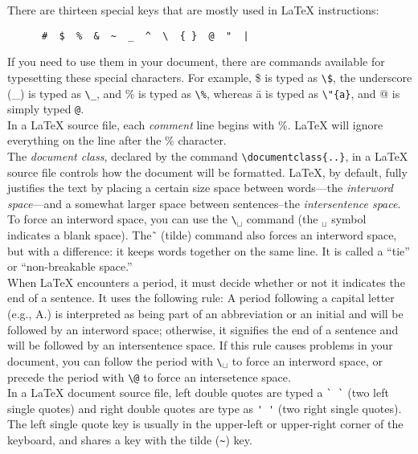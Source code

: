 \documentclass[12pt]{article}
\begin{document}
There are thirteen special keys that are mostly used in \LaTeX \; instructions:
\begin{center}
   \begin{verbatim}
      #  $  %  &  ~  _  ^  \  { }  @  "  |
   \end{verbatim}
\end{center}
If you need to use them in your document, there  are commands available for typesetting these special characters. For example, \$ is typed as \verb+\$+, the underscore (\_) is typed as \verb+\_+, and \% is typed as \verb+\%+, whereas \"{a} is typed as \verb+\"{a}+, and @ is simply typed \verb+@+.\\

In a \LaTeX \; source file, each \emph{comment} line begins with \%. \LaTeX \;  will ignore everything on the line after the \% character. \\

The \emph{document class}, declared by the command \verb+\documentclass{..}+, in a \LaTeX \; source file controls how the document will be formatted. \LaTeX, by default, fully justifies the text by placing a certain size space between words---the \emph{interword space}---and a somewhat larger space between sentences--the \emph{intersentence space}.  To force an interword space, you can use the \verb+\+$_{\sqcup}$ command (the $_{\sqcup}$ symbol indicates a blank space). The \~ \, (tilde) command also forces an interword space, but with a difference: it keeps words together on the same line.  It is called a ``tie'' or ``non-breakable space.''\\

When \LaTeX \; encounters a period, it must decide whether or not it indicates the end of a sentence. It uses the following rule: A period following a capital letter (e.g., A.) is interpreted as being part of an abbreviation or an initial and will be followed by an interword space; otherwise, it signifies the end of a sentence and will be followed by an intersentence space.  If this rule causes problems in your document, you can follow the period with  \verb+\+$_{\sqcup}$ to force an interword space, or precede the period with \verb+\@+ to force an intersetence space.\\

In a \LaTeX \; document source file, left double quotes are typed a \verb+` `+ (two left single quotes) and right double quotes are type as \verb+' '+ (two right single quotes). The left single quote key is usually in the upper-left or upper-right corner of the keyboard, and shares a key with the tilde (\verb+~+) key.\\
\end{document}
